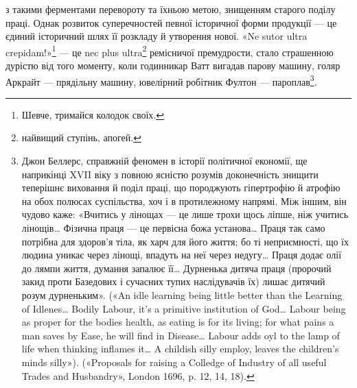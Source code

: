\parcont{}  %
з такими ферментами перевороту та їхньою метою, знищенням
старого поділу праці. Однак розвиток суперечностей певної історичної
форми продукції — це єдиний історичний шлях її розкладу
й утворення нової. «Ne sutor ultra crepidam!»\footnote*{
Шевче, тримайся колодок своїх. 
} — це nec plus ultra\footnote*{
найвищий ступінь, апогей. 
} ремісничої премудрости, стало страшенною дурістю від
того моменту, коли годинникар Ватт вигадав парову машину,
голяр Аркрайт — прядільну машину, ювелірний робітник Фултон
— пароплав\footnote{
Джон Беллерс, справжній феномен в історії політичної економії,
ще наприкінці XVII віку з повною ясністю розумів доконечність знищити
теперішнє виховання й поділ праці, що породжують гіпертрофію й атрофію
на обох полюсах суспільства, хоч і в протилежному напрямі. Між
іншим, він чудово каже: «Вчитись у лінощах — це лише трохи щось ліпше,
ніж учитись лінощів\dots{} Фізична праця — це первісна божа установа\dots{}
Праця так само потрібна для здоров’я тіла, як харч для його життя;
бо ті неприємності, що їх людина уникає через лінощі, впадуть на неї
через недугу\dots{} Праця додає олії до лямпи життя, думання запалює її\dots{}
Дурненька дитяча праця (пророчий закид проти Базедових і сучасних
тупих наслідувачів їх) лишає дитячий розум дурненьким». («An idle
learning being little better than the Learning of Idlenes\dots{} Bodily Labour,
it’s a primitive institution of God\dots{} Labour being as proper for the
bodies health, as eating is for its living; for what pains a man saves by
Ease, he will find in Disease\dots{} Labour adds oyl to the lamp of life when
thinking inflames it\dots{} A childish silly employ, leaves the children’s minds
silly»). («Proposals for raising a Colledge of Industry of all useful Trades
and Husbandry», London 1696, p. 12, 14, 18).
}.

